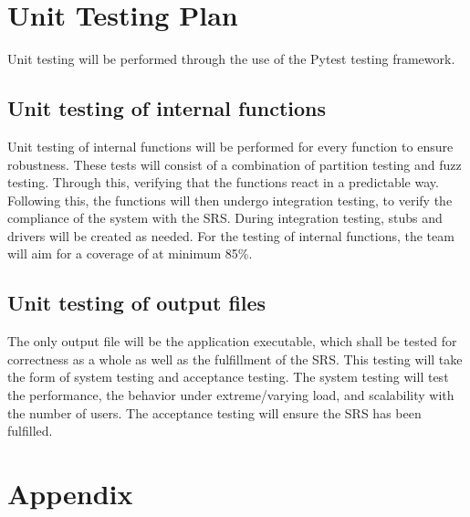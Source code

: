\documentclass[12pt, titlepage]{article}
\begin{document}
\section{Unit Testing Plan}
Unit testing will be performed through the use of the Pytest testing framework.

\subsection{Unit testing of internal functions}
Unit testing of internal functions will be performed for every function to ensure robustness. These tests will consist of a combination of partition testing and fuzz testing. Through this, verifying that the functions react in a predictable way. Following this, the functions will then undergo integration testing, to verify the compliance of the system with the SRS. During integration testing, stubs and drivers will be created as needed. For the testing of internal functions, the team will aim for a coverage of at minimum 85\%.

\subsection{Unit testing of output files}		
The only output file will be the application executable, which shall be tested for correctness as a whole as well as the fulfillment of the SRS. This testing will take the form of system testing and acceptance testing. The system testing will test the performance, the behavior under extreme/varying load, and scalability with the number of users. The acceptance testing will ensure the SRS has been fulfilled.



\newpage

\section{Appendix}

\end{document}

